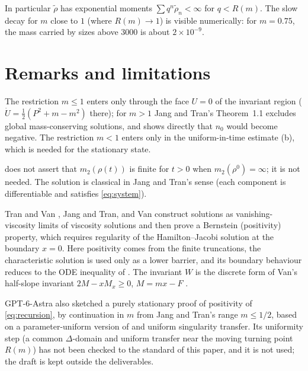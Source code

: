 \documentclass[11pt,a4paper]{report}
\newcommand{\rtil}{\tilde\rho}
\begin{document}
In particular \(\rtil\) has exponential moments \(\sum q^n\rtil_n<\infty\) for \(q<R(m)\). The slow decay for
\(m\) close to \(1\) (where \(R(m)\to1\)) is visible numerically: for \(m=0.75\), the mass carried by sizes
above \(3000\) is about \(2\times10^{-9}\).

\section{Remarks and limitations}

\begin{remark}
The restriction \(m\le1\) enters only through the face \(U=0\) of the invariant region
(\(\dot U=\frac12(P^2+m-m^2)\) there); for \(m>1\) Jang and Tran's Theorem~1.1 excludes global mass-conserving
solutions, and  shows directly that \(n_0\) would become negative. The restriction \(m<1\)
enters only in the uniform-in-time estimate (b), which is needed for the stationary state.
\end{remark}

\begin{remark}[moments]
 does not assert that \(m_2(\rho(t))\) is finite for \(t>0\) when \(m_2(\rho^0)=\infty\);
it is not needed. The solution is classical in Jang and Tran's sense (each component is differentiable and
satisfies \eqref{eq:system}).
\end{remark}

\begin{remark}
Tran and Van \autocite{TranVan2022}, Jang and Tran, and Van construct solutions as vanishing-viscosity limits of viscosity
solutions and then prove a Bernstein (positivity) property, which requires regularity of the
Hamilton--Jacobi solution at the boundary \(x=0\). Here positivity comes from the finite truncations, the
characteristic solution is used only as a lower barrier, and its boundary behaviour reduces to the ODE
inequality of . The invariant \(W\) is the discrete form of Van's half-slope invariant
\(2M-xM_x\ge0\), \(M=mx-F\) \autocite{Van2026}.
\end{remark}

\begin{remark}
GPT-6-Astra also sketched a purely stationary proof of positivity of \eqref{eq:recursion}, by continuation in
\(m\) from Jang and Tran's range \(m\le1/2\), based on a parameter-uniform version of
 and uniform singularity transfer. Its uniformity step (a common
\(\Delta\)-domain and uniform transfer near the moving turning point \(R(m)\)) has not been checked to the
standard of this paper, and it is not used; the draft is kept outside the deliverables.
\end{remark}
\end{document}
